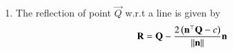 \begin{enumerate}[label=\thesubsection.\arabic*.,ref=\thesubsection.\theenumi]
	\item 
The reflection of point $\vec{Q}$ w.r.t a line is given by
\begin{align}
	\label{eq:11/10/4/22}
\mathbf{R} = \mathbf{Q} -\frac{2\left(\mathbf{n}^{\top}\mathbf{Q}-c\right)}{\left\lVert\mathbf{n}\right\rVert}\mathbf{n}
\end{align}
\end{enumerate}
